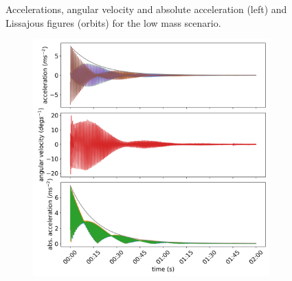 \documentclass{article}
\begin{document}
\begin{figure}[ht]
\begin{subfigure}[b]{0.45\textwidth}
        \caption{}
        \label{fig:low-mass:orbit}
    \end{subfigure}
    
    \caption{Accelerations, angular velocity and absolute acceleration (left) and Lissajous figures (orbits) for the low mass scenario.}
    \label{fig:low-mass}
\end{figure}


\begin{figure}

    \centering
    \begin{subfigure}[b]{0.45\textwidth}
        \centering
        \includegraphics[width=\textwidth]{../results/experiment/medium_mass_acceleration.png}
        \caption{}
        \label{fig:medium-mass:acc}
    \end{subfigure}
    \begin{subfigure}[b]{0.45\textwidth}
        \centering

\end{subfigure}
\end{figure}
\end{document}
